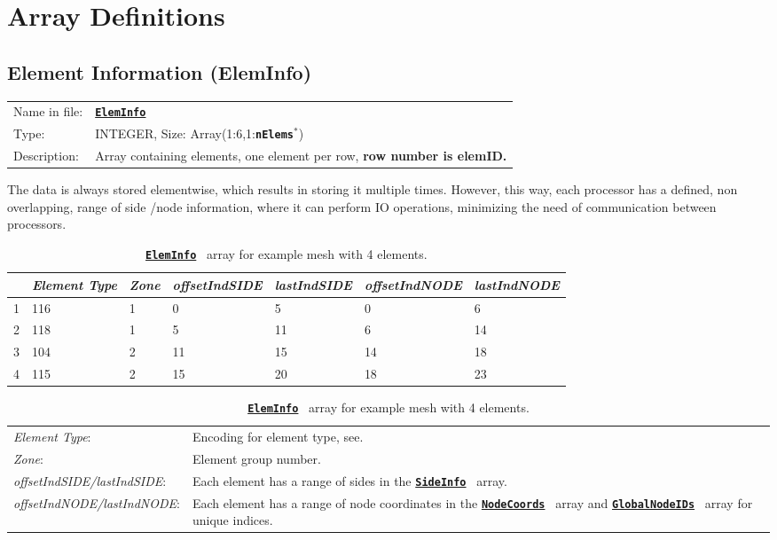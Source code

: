 \documentclass[a4paper,headsepline]{scrreprt}
\newcommand\rf[1]{\prettyref{#1}}
\newcommand\ttbf[1]{\textbf{\texttt{#1}}}
\newcommand\ElemInfo{\hyperlink{ElemInfo}{\ttbf{ElemInfo}}}
\newcommand\SideInfo{\hyperlink{SideInfo}{\ttbf{SideInfo}}}
\newcommand\NodeCoords{\hyperlink{NodeInfo}{\ttbf{NodeCoords}}}
\newcommand\GlobalNodeIDs{\hyperlink{NodeInfo}{\ttbf{GlobalNodeIDs}}}
\newcommand\nElems{\ttbf{nElems}}
\begin{document}
\clearpage


\section{Array Definitions}


\hypertarget{ElemInfo}{\subsection{Element Information (ElemInfo)}}
\label{sec:ElemInfo}

\begin{tabularx}{1.0\textwidth}{lX}
Name in file: & \ElemInfo \\
Type:         & INTEGER, Size: Array(1:6,1:\nElems$^*$) \\
Description:  & Array containing elements, one element per row, \textbf{row number is elemID.} \\
\end{tabularx}

The data is always stored elementwise, which results in storing it multiple times. However, this way, each processor has a defined, non overlapping, range of side /node information, where it can perform IO operations, minimizing the need of communication between processors. 

\begin{table}[h!]
\centering
\begin{tabular}{|l|l|l|l|l|l|l|} \hline
  & \emph{Element Type} & \emph{Zone} & \emph{offsetIndSIDE} & \emph{lastIndSIDE} & \emph{offsetIndNODE} & \emph{lastIndNODE} \\ \hline\hline
1 & 116 & 1 &  0 &  5 &  0 &  6 \\ \hline
2 & 118 & 1 &  5 & 11 &  6 & 14 \\ \hline
3 & 104 & 2 & 11 & 15 & 14 & 18 \\ \hline
4 & 115 & 2 & 15 & 20 & 18 & 23 \\ \hline
\end{tabular} \vspace{2ex}

\begin{tabularx}{1.0\textwidth}{|lX|} \hline
\emph{Element Type}: & Encoding for element type, see\rf{sec:elemtypes}. \\
%
\emph{Zone}: & Element group number. \\
%
\emph{offsetIndSIDE/lastIndSIDE}: & Each element has a range of sides in the \SideInfo~ array. \\
%
\emph{offsetIndNODE/lastIndNODE}: & Each element has a range of node coordinates in the \NodeCoords~ array and \GlobalNodeIDs~ array for unique indices. \\\hline
\end{tabularx}
\caption{\protect\ElemInfo~ array for example mesh \rf{fig:exmesh} with 4 elements.}
\label{tab:ex_eleminfo}
\end{table}
\end{document}
